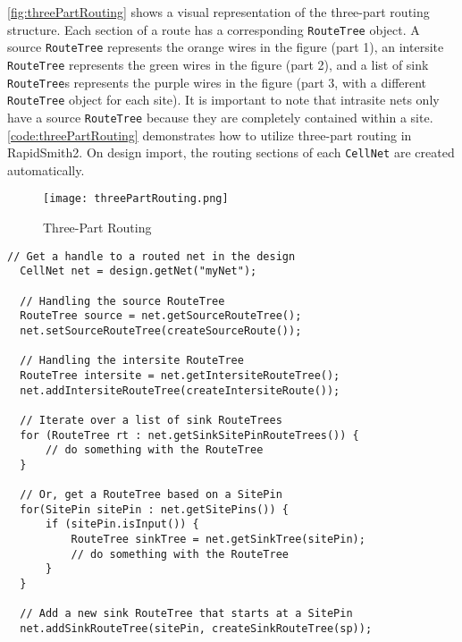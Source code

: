\noindent \autoref{fig:threePartRouting} shows a visual representation of the
three-part routing structure. Each section of a route has a corresponding
\texttt{RouteTree} object. A source \texttt{RouteTree} represents the orange
wires in the figure (part 1), an intersite \texttt{RouteTree} represents the
green wires in the figure (part 2), and a list of sink \texttt{RouteTree}s
represents the purple wires in the figure (part 3, with a different
\texttt{RouteTree} object for each site). It is important to note that
intrasite nets only have a source \texttt{RouteTree} because they are
completely contained within a site. \autoref{code:threePartRouting} demonstrates
how to utilize three-part routing in RapidSmith2. On design import, the routing
sections of each \texttt{CellNet} are created automatically.

\begin{figure}[t]
\centering
\texttt{[image: threePartRouting.png]}
\caption{Three-Part Routing}
\label{fig:threePartRouting}
\end{figure}

\begin{lstlisting}[xleftmargin=1.5em, framexleftmargin=1.5em,
caption=Demonstration of three-part routing in RapidSmith2,
label=code:threePartRouting] 
  // Get a handle to a routed net in the design 
  CellNet net = design.getNet("myNet");

  // Handling the source RouteTree
  RouteTree source = net.getSourceRouteTree();
  net.setSourceRouteTree(createSourceRoute());

  // Handling the intersite RouteTree
  RouteTree intersite = net.getIntersiteRouteTree();
  net.addIntersiteRouteTree(createIntersiteRoute());

  // Iterate over a list of sink RouteTrees
  for (RouteTree rt : net.getSinkSitePinRouteTrees()) {
	  // do something with the RouteTree
  }

  // Or, get a RouteTree based on a SitePin
  for(SitePin sitePin : net.getSitePins()) {
	  if (sitePin.isInput()) {
		  RouteTree sinkTree = net.getSinkTree(sitePin);
		  // do something with the RouteTree
	  }
  }

  // Add a new sink RouteTree that starts at a SitePin
  net.addSinkRouteTree(sitePin, createSinkRouteTree(sp));
\end{lstlisting}


